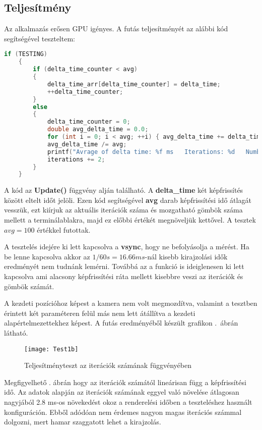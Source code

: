 \cleardoublepage
\subsection{Teljesítmény}

Az alkalmazás erősen GPU igényes.  A futás teljesítményét az alábbi kód segítségével teszteltem:
\begin{lstlisting}[language={C++}]
if (TESTING)
	{
		if (delta_time_counter < avg)
		{
			delta_time_arr[delta_time_counter] = delta_time;
			++delta_time_counter;
		}
		else
		{
			delta_time_counter = 0;
			double avg_delta_time = 0.0;
			for (int i = 0; i < avg; ++i) { avg_delta_time += delta_time_arr[i]; }
			avg_delta_time /= avg;
			printf("Avrage of delta time: %f ms   Iterations: %d   Number of spheres: %d \n", avg_delta_time*1000, iterations, ballCount);
			iterations += 2;
		}
	}
\end{lstlisting}

A kód az \textbf{Update()} függvény alján található. A \textbf{delta\_time} két képfrissítés között eltelt időt jelöli. Ezen kód segítségével \textbf{avg} darab képfrissítési idő átlagát vesszük, ezt kiírjuk az aktuális iterációk száma és mozgatható gömbök száma mellett a terminálablakra, majd ez előbbi értékét megnöveljük kettővel. A tesztek $avg=100$ értékkel futottak.

A tesztelés idejére ki lett kapcsolva a \textbf{vsync}, hogy ne befolyásolja a mérést. Ha be lenne kapcsolva akkor az $1/60 s = 16.66 ms$-nál kisebb kirajzolási idők eredményét nem tudnánk lemérni. Továbbá az a funkció is ideiglenesen ki lett kapcsolva ami alacsony képfrissítési ráta mellett kisebbre veszi az iterációk és gömbök számát.

A kezdeti pozícióhoz képest a kamera nem volt megmozdítva, valamint a tesztben érintett két paraméteren felül más nem lett átállítva a kezdeti alapértelmezettekhez képest. A futás eredményéből készült grafikon .~ábrán látható.

\begin{figure}[H]
	\centering
	\texttt{[image: Test1b]}
	\caption{Teljesítményteszt az iterációk számának függvényében}
	\label{fig:Test1}
\end{figure}


Megfigyelhető . ábrán hogy az iterációk számától lineárisan függ a képfrissítési idő. Az adatok alapján az iterációk számának eggyel való növelése átlagosan nagyjából 2.8 ms-os növekedést okoz a renderelési időben a teszteléshez használt konfiguráción. Ebből adódóan nem érdemes nagyon magas iterációs számmal dolgozni, mert hamar szaggatott lehet a kirajzolás.


